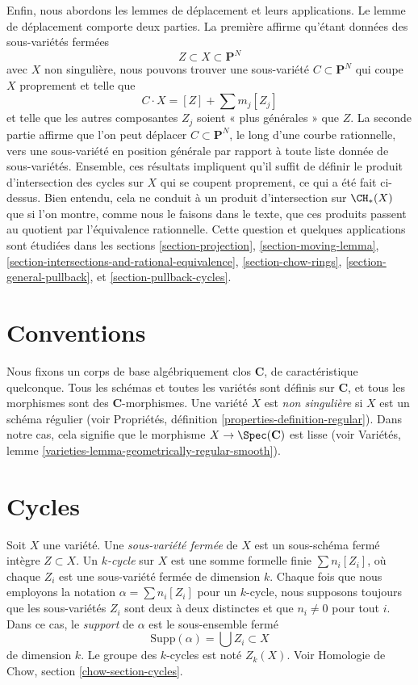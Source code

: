 \medskip\noindent
Enfin, nous abordons les lemmes de déplacement et leurs applications. Le lemme de
déplacement comporte deux parties. La première affirme qu'étant données des sous-variétés fermées
$$
Z \subset X \subset \mathbf{P}^N
$$
avec $X$ non singulière, nous pouvons trouver une sous-variété $C \subset \mathbf{P}^N$
qui coupe $X$ proprement et telle que
$$
C \cdot X = [Z] + \sum m_j [Z_j]
$$
et telle que les autres composantes $Z_j$ soient « plus générales » que $Z$.
La seconde partie affirme que l'on peut déplacer $C \subset \mathbf{P}^N$, le long
d'une courbe rationnelle, vers une sous-variété en position générale par rapport à
toute liste donnée de sous-variétés. Ensemble, ces résultats impliquent qu'il suffit
de définir le produit d'intersection des cycles sur $X$ qui se coupent
proprement, ce qui a été fait ci-dessus. Bien entendu, cela ne conduit à un produit d'intersection
sur $\CH_*(X)$ que si l'on montre, comme nous le faisons dans le texte, que ces produits
passent au quotient par l'équivalence rationnelle. Cette question et quelques applications sont étudiées
dans les sections
\ref{section-projection},
\ref{section-moving-lemma},
\ref{section-intersections-and-rational-equivalence},
\ref{section-chow-rings},
\ref{section-general-pullback}, et
\ref{section-pullback-cycles}.



\section{Conventions}
\label{section-conventions}

\noindent
Nous fixons un corps de base algébriquement clos $\mathbf{C}$, de caractéristique
quelconque. Tous les schémas et toutes les variétés sont définis sur $\mathbf{C}$, et tous les
morphismes sont des $\mathbf{C}$-morphismes. Une variété $X$ est
{\it non singulière} si $X$ est un schéma régulier (voir
Propriétés, définition \ref{properties-definition-regular}).
Dans notre cas, cela signifie que le morphisme $X \to \Spec(\mathbf{C})$
est lisse (voir
Variétés, lemme \ref{varieties-lemma-geometrically-regular-smooth}).


\section{Cycles}
\label{section-cycles}

\noindent
Soit $X$ une variété. Une {\it sous-variété fermée} de $X$ est un sous-schéma
fermé intègre $Z \subset X$. Un {\it $k$-cycle} sur $X$ est une somme formelle
finie $\sum n_i [Z_i]$, où chaque $Z_i$ est une sous-variété fermée
de dimension $k$. Chaque fois que nous employons la notation $\alpha = \sum n_i[Z_i]$
pour un $k$-cycle, nous supposons toujours que les sous-variétés $Z_i$ sont deux à deux
distinctes et que $n_i \not = 0$ pour tout $i$. Dans ce cas, le
{\it support} de $\alpha$ est le sous-ensemble fermé
$$
\text{Supp}(\alpha) = \bigcup Z_i \subset X
$$
de dimension $k$. Le groupe des $k$-cycles est noté $Z_k(X)$.
Voir Homologie de Chow, section \ref{chow-section-cycles}.


